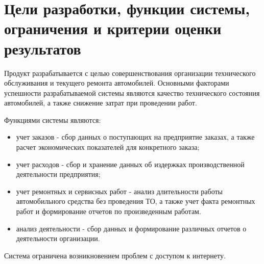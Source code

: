 \documentclass[../nirs.tex]{subfiles}
\begin{document}
\section{Цели разработки, функции системы, ограничения и критерии оценки
результатов}

Продукт разрабатывается с целью совершенствования организации технического
обслуживания и текущего ремонта автомобилей. Основными факторами успешности
разрабатываемой системы являются качество технического состояния автомобилей, а
также снижение затрат при проведении работ.

Функциями системы являются:
\begin{itemize}
	\item учет заказов - сбор данных о поступающих на предприятие заказах, а
		также расчет экономических показателей для конкретного заказа;
	\item учет расходов - сбор и хранение данных об издержках производственной
		деятельности предприятия;
	\item учет ремонтных и сервисных работ - анализ длительности работы
		автомобильного средства без проведения ТО, а также учет факта ремонтных
		работ и формирование отчетов по произведенным работам.
	\item анализ деятельности - сбор данных и формирование различных отчетов о
		деятельности организации.
\end{itemize}

Система ограничена возникновением проблем с доступом к интернету.
\end{document}
